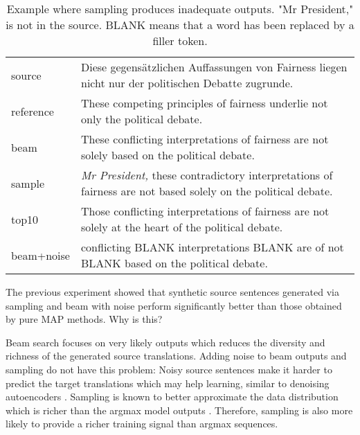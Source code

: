 \documentclass[11pt,a4paper]{article}
\newcommand{\grow}[1]{\rowcolor{gray!10} #1}
\begin{document}
\begin{table*}[t]
\centering
\begin{tabular}{l | p{}}
\toprule
source & Diese gegensätzlichen Auffassungen von Fairness liegen nicht nur der politischen Debatte zugrunde. \\
\grow{reference} & These competing principles of fairness underlie not only the political debate. \\
beam & These conflicting interpretations of fairness are not solely based on the political debate. \\
\grow{sample} & \emph{Mr President,} these contradictory interpretations of fairness are not based solely on the political debate. \\
top10 & Those conflicting interpretations of fairness are not solely at the heart of the political debate. \\
\grow{beam+noise} & conflicting BLANK interpretations BLANK are of not BLANK based on the political debate. \\
\bottomrule
\end{tabular}
\caption{Example where sampling produces inadequate outputs. "Mr President," is not in the source. BLANK means that a word has been replaced by a filler token.
}
\label{tab:sample_vs_topk}
\end{table*}

The previous experiment showed that synthetic source sentences generated via sampling and beam with noise perform significantly better than those obtained by pure MAP methods.
Why is this?

Beam search focuses on very likely outputs which reduces the diversity and richness of the generated source translations. 
Adding noise to beam outputs and sampling do not have this problem:
Noisy source sentences make it harder to predict the target translations which may help learning, similar to denoising autoencoders \citep{vincent:2008:icml}.
Sampling is known to better approximate the data distribution which is richer than the argmax model outputs \citep{ott:uncertainty:2018}. 
Therefore, sampling is also more likely to provide a richer training signal than argmax sequences. 
\end{document}

